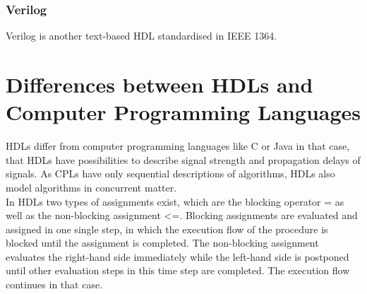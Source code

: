 \subsubsection{Verilog}
Verilog is another text-based HDL standardised in IEEE 1364. 

\lstset{language=Verilog, tabsize=4}
\begin{center}
\end{center}

\section{Differences between HDLs and Computer Programming Languages}
HDLs differ from computer programming languages like C or Java in that case, that HDLs have possibilities to describe signal strength and propagation delays of signals. As CPLs have only sequential descriptions of algorithms, HDLs also model algorithms in concurrent matter.\\
In HDLs two types of assignments exist, which are the blocking operator = as well as the non-blocking assignment \textless=. Blocking assignments are evaluated and assigned in one single step, in which the execution flow of the procedure is blocked until the assignment is completed. The non-blocking assignment evaluates the right-hand side immediately while the left-hand side is postponed until other evaluation steps in this time step are completed. The execution flow continues in that case.\cite{Sut96}
